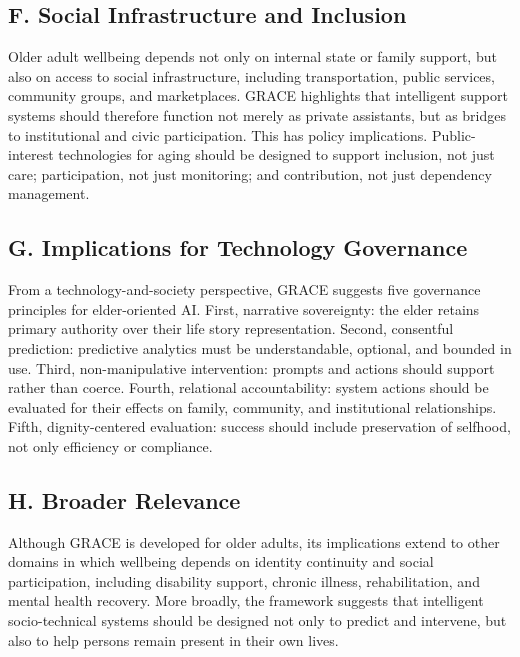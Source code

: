 \documentclass[
  journal,
]{IEEEtran}%
\begin{document}
\subsection{F. Social Infrastructure and
Inclusion}\label{f.-social-infrastructure-and-inclusion}

Older adult wellbeing depends not only on internal state or family
support, but also on access to social infrastructure, including
transportation, public services, community groups, and marketplaces.
GRACE highlights that intelligent support systems should therefore
function not merely as private assistants, but as bridges to
institutional and civic participation. This has policy implications.
Public-interest technologies for aging should be designed to support
inclusion, not just care; participation, not just monitoring; and
contribution, not just dependency management.

\subsection{G. Implications for Technology
Governance}\label{g.-implications-for-technology-governance}

From a technology-and-society perspective, GRACE suggests five
governance principles for elder-oriented AI. First, narrative
sovereignty: the elder retains primary authority over their life story
representation. Second, consentful prediction: predictive analytics must
be understandable, optional, and bounded in use. Third, non-manipulative
intervention: prompts and actions should support rather than coerce.
Fourth, relational accountability: system actions should be evaluated
for their effects on family, community, and institutional relationships.
Fifth, dignity-centered evaluation: success should include preservation
of selfhood, not only efficiency or compliance.

\subsection{H. Broader Relevance}\label{h.-broader-relevance}

Although GRACE is developed for older adults, its implications extend to
other domains in which wellbeing depends on identity continuity and
social participation, including disability support, chronic illness,
rehabilitation, and mental health recovery. More broadly, the framework
suggests that intelligent socio-technical systems should be designed not
only to predict and intervene, but also to help persons remain present
in their own lives.
\end{document}
